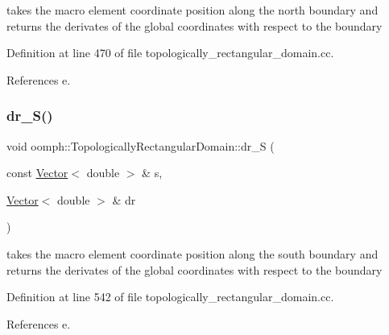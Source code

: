 takes the macro element coordinate position along the north boundary and returns the derivates of the global coordinates with respect to the boundary 



Definition at line 470 of file topologically\+\_\+rectangular\+\_\+domain.\+cc.



References e.

\mbox{\label{classoomph_1_1TopologicallyRectangularDomain_a24a20bc9749166ca61bd4373bc381680}} 
\subsubsection{\texorpdfstring{dr\+\_\+\+S()}{dr\_S()}}
{\footnotesize\ttfamily void oomph\+::\+Topologically\+Rectangular\+Domain\+::dr\+\_\+S (\begin{DoxyParamCaption}\item[{const \hyperlink{classoomph_1_1Vector}{Vector}$<$ double $>$ \&}]{s,  }\item[{\hyperlink{classoomph_1_1Vector}{Vector}$<$ double $>$ \&}]{dr }\end{DoxyParamCaption})\hspace{0.3cm}{\ttfamily [private]}}



takes the macro element coordinate position along the south boundary and returns the derivates of the global coordinates with respect to the boundary 



Definition at line 542 of file topologically\+\_\+rectangular\+\_\+domain.\+cc.



References e.

\mbox{\label{classoomph_1_1TopologicallyRectangularDomain_a91b92399343513aed5cfa65a8377b01a}} 
